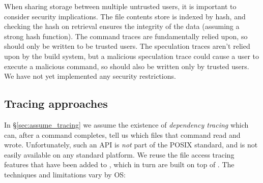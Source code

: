 When sharing storage between multiple untrusted users, it is important to consider security implications. The file contents store is indexed by hash, and checking the hash on retrieval ensures the integrity of the data (assuming a strong hash function). The command traces are fundamentally relied upon, so should only be written to be trusted users. The speculation traces aren't relied upon by the build system, but a malicious speculation trace could cause a user to execute a malicious command, so should also be written only by trusted users. We have not yet implemented any security restrictions.

\subsection{Tracing approaches}
\label{sec:tracing}

In \S\ref{sec:assume_tracing} we assume the existence of \emph{dependency tracing} which can, after a command completes, tell us which files that command read and wrote. Unfortunately, such an API is \emph{not} part of the POSIX standard, and is not easily available on any standard platform. We reuse the file access tracing features that have been added to \Shake \cite{neil:file_access}, which in turn are built on top of \Fsatrace \cite{fsatrace}. The techniques and limitations vary by OS:

